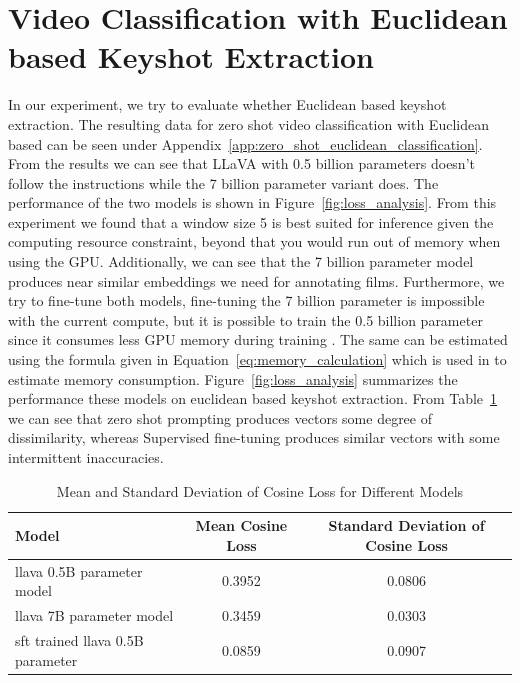 \documentclass[12pt]{report}
\begin{document}
	\section{Video Classification with Euclidean based Keyshot Extraction}
	
	In our experiment, we try to evaluate whether Euclidean based keyshot extraction. The resulting data for zero shot video classification with Euclidean based can be seen under Appendix~\ref{app:zero_shot_euclidean_classification}. From the results we can see that LLaVA with 0.5 billion parameters doesn't follow the instructions while the 7 billion parameter variant does. The performance of the two models is shown in Figure~\ref{fig:loss_analysis}. From this experiment we found that a window size 5 is best suited for inference given the computing resource constraint, beyond that you would run out of memory when using the GPU. Additionally, we can see that the 7 billion parameter model produces near similar embeddings we need for annotating films. Furthermore, we try to fine-tune both models, fine-tuning the 7 billion parameter is impossible with the current compute, but it is possible 
	to train the 0.5 billion parameter since it consumes less GPU memory during training . The same can be estimated using the formula given in Equation~\ref{eq:memory_calculation} which is used in \cite{calculator} to estimate memory consumption. Figure~\ref{fig:loss_analysis} summarizes the performance these models on euclidean based keyshot extraction. From Table~\ref{tab:cosine_loss} we can see that zero shot prompting produces vectors some degree of dissimilarity, whereas Supervised fine-tuning produces similar vectors with some intermittent inaccuracies.
	
	
	\begin{table}[h]
		\centering
		\begin{tabular}{lcc}
			\toprule
			\textbf{Model} & \textbf{Mean Cosine Loss} & \textbf{Standard Deviation of Cosine Loss} \\
			\midrule
			llava 0.5B parameter model & 0.3952 & 0.0806 \\
			llava 7B parameter model & 0.3459 & 0.0303 \\
			sft trained llava 0.5B parameter & 0.0859 & 0.0907 \\
			\bottomrule
		\end{tabular}
		\caption{Mean and Standard Deviation of Cosine Loss for Different Models}
		\label{tab:cosine_loss}
	\end{table}
	
\end{document}
